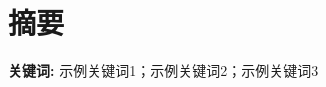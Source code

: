 \chapter*{摘\quad 要}



\mbox{}\vspace{0.1cm}

{\heiti \bfseries{关键词:}}\hspace{0.2cm} {示例关键词1；示例关键词2；示例关键词3}

